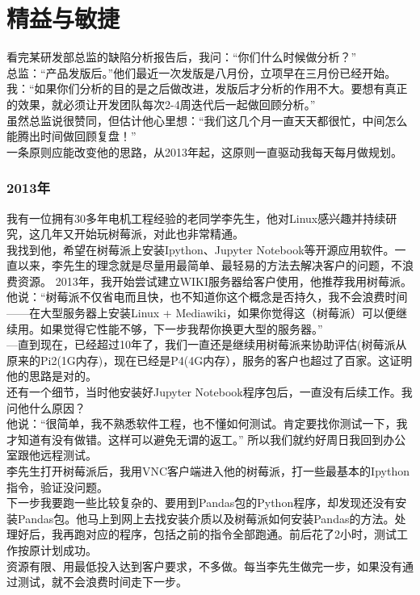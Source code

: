 \chapter{精益与敏捷} %

看完某研发部总监的缺陷分析报告后，我问：``你们什么时候做分析？''\\
总监：``产品发版后。''他们最近一次发版是八月份，立项早在三月份已经开始。\\
我：``如果你们分析的目的是之后做改进，发版后才分析的作用不大。要想有真正的效果，就必须让开发团队每次2-4周迭代后一起做回顾分析。''\\
虽然总监说很赞同，但估计他心里想：``我们这几个月一直天天都很忙，中间怎么能腾出时间做回顾复盘！''\\
一条原则应能改变他的思路，从2013年起，这原则一直驱动我每天每月做规划。

\hypertarget{ux5e74}{%
\subsection{2013年}\label{ux5e74}}

我有一位拥有30多年电机工程经验的老同学李先生，他对Linux感兴趣并持续研究，这几年又开始玩树莓派，对此也非常精通。\\
我找到他，希望在树莓派上安装Ipython、Jupyter
Notebook等开源应用软件。一直以来，李先生的理念就是尽量用最简单、最轻易的方法去解决客户的问题，不浪费资源。
2013年，我开始尝试建立WIKI服务器给客户使用，他推荐我用树莓派。\\
他说：``树莓派不仅省电而且快，也不知道你这个概念是否持久，我不会浪费时间------在大型服务器上安装Linux
+
Mediawiki，如果你觉得这（树莓派）可以便继续用。如果觉得它性能不够，下一步我帮你换更大型的服务器。''\\
---直到现在，已经超过10年了，我们一直还是继续用树莓派来协助评估(树莓派从原来的Pi2(1G内存)，现在已经是P4(4G内存），服务的客户也超过了百家。这证明他的思路是对的。\\
还有一个细节，当时他安装好Jupyter
Notebook程序包后，一直没有后续工作。我问他什么原因？\\
他说：``很简单，我不熟悉软件工程，也不懂如何测试。肯定要找你测试一下，我才知道有没有做错。这样可以避免无谓的返工。''
所以我们就约好周日我回到办公室跟他远程测试。\\
李先生打开树莓派后，我用VNC客户端进入他的树莓派，打一些最基本的Ipython指令，验证没问题。\\
下一步我要跑一些比较复杂的、要用到Pandas包的Python程序，却发现还没有安装Pandas包。他马上到网上去找安装介质以及树莓派如何安装Pandas的方法。处理好后，我再跑对应的程序，包括之前的指令全部跑通。前后花了2小时，测试工作按原计划成功。\\
资源有限、用最低投入达到客户要求，不多做。每当李先生做完一步，如果没有通过测试，就不会浪费时间走下一步。

